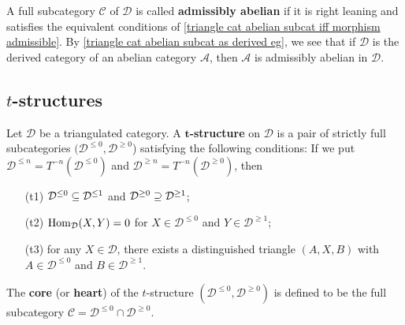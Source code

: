 A full subcategory $\mathcal{C}$ of $\mathcal{D}$ is called \textbf{admissibly abelian} if it is right leaning and satisfies the equivalent conditions of \cref{triangle cat abelian subcat iff morphism admissible}. By \cref{triangle cat abelian subcat as derived eg}, we see that if $\mathcal{D}$ is the derived category of an abelian category $\mathcal{A}$, then $\mathcal{A}$ is admissibly abelian in $\mathcal{D}$.

\subsection{\texorpdfstring{$t$}{t}-structures}
Let $\mathcal{D}$ be a triangulated category. A \textbf{$\bm{t}$-structure} on $\mathcal{D}$ is a pair of strictly full subcategories $(\mathcal{D}^{\leq 0},\mathcal{D}^{\geq 0}$) satisfying the following conditions: If we put $\mathcal{D}^{\leq n}=T^{-n}(\mathcal{D}^{\leq 0})$ and $\mathcal{D}^{\geq n}=T^{-n}(\mathcal{D}^{\geq 0})$, then
\begin{enumerate}
    \item[(t1)] $\mathcal{D}^{\leq 0}\subseteq\mathcal{D}^{\leq 1}$ and $\mathcal{D}^{\geq 0}\supseteq\mathcal{D}^{\geq 1}$;
    \item[(t2)] $\mathrm{Hom}_{\mathcal{D}}(X,Y)=0$ for $X\in\mathcal{D}^{\leq 0}$ and $Y\in\mathcal{D}^{\geq 1}$; 
    \item[(t3)] for any $X\in\mathcal{D}$, there exists a distinguished triangle $(A,X,B)$ with $A\in\mathcal{D}^{\leq 0}$ and $B\in\mathcal{D}^{\geq 1}$.
\end{enumerate}
The \textbf{core} (or \textbf{heart}) of the $t$-structure $(\mathcal{D}^{\leq 0},\mathcal{D}^{\geq 0})$ is defined to be the full subcategory $\mathcal{C}=\mathcal{D}^{\leq 0}\cap\mathcal{D}^{\geq 0}$.

